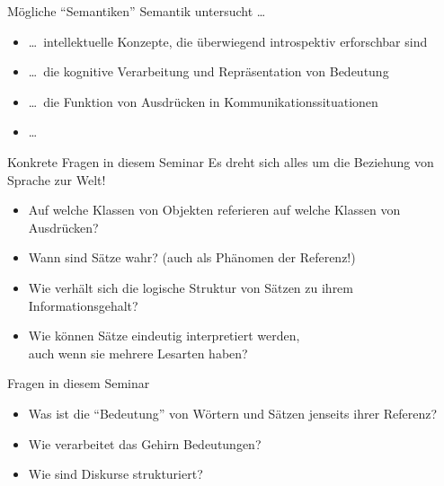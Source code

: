 \begin{frame}
  {Mögliche "`Semantiken"'}
  \onslide<+->
  \onslide<+->
  Semantik untersucht \ldots\\
  \begin{itemize}[<+->]
    \item \ldots\ intellektuelle Konzepte, die überwiegend introspektiv erforschbar sind
    \item \ldots\ die kognitive Verarbeitung und Repräsentation von Bedeutung
    \item \ldots\ die Funktion von Ausdrücken in Kommunikationssituationen
    \item \ldots\ 
  \end{itemize}
\end{frame}

\begin{frame}
  {Konkrete Fragen in diesem Seminar}
  \onslide<+->
  \onslide<+->
  Es dreht sich alles um die Beziehung von Sprache zur Welt!\\
  \Zeile
  \begin{itemize}[<+->]
    \item Auf welche Klassen von Objekten \alert{referieren} auf welche Klassen von Ausdrücken?
    \item Wann sind Sätze wahr? (auch als Phänomen der \alert{Referenz}!)
    \item Wie verhält sich die logische Struktur von Sätzen zu ihrem Informationsgehalt?
    \item Wie können Sätze eindeutig interpretiert werden,\\
      auch wenn sie mehrere Lesarten haben?
  \end{itemize}
\end{frame}

\begin{frame}
  { Fragen in diesem Seminar}
  \onslide<+->
  \begin{itemize}[<+->]
    \item Was ist die "`Bedeutung"' von Wörtern und Sätzen jenseits ihrer Referenz?
    \item Wie verarbeitet das Gehirn Bedeutungen?
    \item Wie sind Diskurse strukturiert?
  \end{itemize}
\end{frame}

